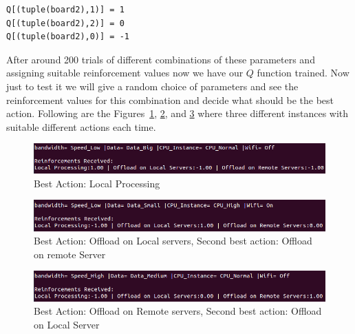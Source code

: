 \documentclass{article}
\begin{document}
\begin{small}
\begin{lstlisting}
Q[(tuple(board2),1)] = 1
Q[(tuple(board2),2)] = 0
Q[(tuple(board2),0)] = -1
\end{lstlisting}
\end{small}
After around 200 trials of different combinations of these parameters and assigning suitable reinforcement values now we have our $Q$ function trained. Now just to test it we will give a random choice of parameters and see the reinforcement values for this combination and decide what should be the best action. Following are the Figures~\ref{fig:RL_Local}, \ref{fig:RL_offload_Local}, and \ref{fig:RL_offload_Remote} where three different instances with suitable different actions each time.                
\begin{figure}[h!]
  \centering
  \includegraphics[width=5in]{RL_Local.png}
  \caption{Best Action: Local Processing}
  \label{fig:RL_Local}
\end{figure}
\begin{figure}[h!]
  \centering
  \includegraphics[width=5in]{RL_offload_Local.png}
  \caption{Best Action: Offload on Local servers, Second best action: Offload on remote Server}
  \label{fig:RL_offload_Local}
\end{figure}
\begin{figure}[h!]
  \centering
  \includegraphics[width=5in]{RL_offload_Remote.png}
  \caption{Best Action: Offload on Remote servers, Second best action: Offload on Local Server}
  \label{fig:RL_offload_Remote}
\end{figure}
\end{document}
